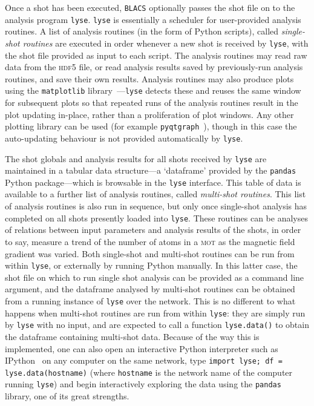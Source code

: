 Once a shot has been executed, \texttt{BLACS} optionally passes the shot file on to the analysis program \texttt{lyse}. \texttt{lyse} is essentially a scheduler for user-provided analysis routines. A list of analysis routines (in the form of Python scripts), called \emph{single-shot routines} are executed in order whenever a new shot is received by \texttt{lyse}, with the shot file provided as input to each script. The analysis routines may read raw data from the \textsc{hdf5} file, or read analysis results saved by previously-run analysis routines, and save their own results. Analysis routines may also produce plots using the \texttt{matplotlib} library~\cite{Hunter:2007}---\texttt{lyse} detects these and reuses the same window for subsequent plots so that repeated runs of the analysis routines result in the plot updating in-place, rather than a proliferation of plot windows. Any other plotting library can be used (for example \texttt{pyqtgraph}~\cite{campagnola_pyqtgraph_2016}), though in this case the auto-updating behaviour is not provided automatically by \texttt{lyse}.

The shot globals and analysis results for all shots received by \texttt{lyse} are maintained in a tabular data structure---a `dataframe' provided by the \texttt{pandas}~\cite{mckinney-proc-scipy-2010} Python package---which is browsable in the \texttt{lyse} interface. This table of data is available to a further list of analysis routines, called \emph{multi-shot routines}. This list of analysis routines is also run in sequence, but only once single-shot analysis has completed on all shots presently loaded into \texttt{lyse}. These routines can be analyses of relations between input parameters and analysis results of the shots, in order to say, measure a trend of the number of atoms in a \textsc{mot} as the magnetic field gradient was varied. Both single-shot and multi-shot routines can be run from within \texttt{lyse}, or externally by running Python manually. In this latter case, the shot file on which to run single shot analysis can be provided as a command line argument, and the dataframe analysed by multi-shot routines can be obtained from a running instance of \texttt{lyse} over the network. This is no different to what happens when multi-shot routines are run from within \texttt{lyse}: they are simply run by \texttt{lyse} with no input, and are expected to call a function \texttt{lyse.data()} to obtain the dataframe containing multi-shot data. Because of the way this is implemented, one can also open an interactive Python interpreter such as IPython~\cite{perez_ipython:_2007} on any computer on the same network, type \texttt{import lyse; df = lyse.data(hostname)} (where \texttt{hostname} is the network name of the computer running \texttt{lyse}) and begin interactively exploring the data using the \texttt{pandas} library, one of its great strengths.

